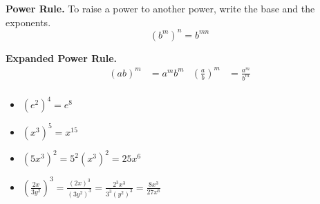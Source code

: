
\begin{tcbraster}[
    raster columns = 2,
    raster equal height,
    colback = white,
    raster before skip = 0in, raster after skip = 0in,
]
\begin{tcolorbox}[]
    {\bfseries Power Rule.}
    To raise a power to another power,
    write the base and  the exponents.
    \[\left(b^m\right)^n = b^{mn}\]
\end{tcolorbox}
\begin{tcolorbox}[]
    {\bfseries Expanded Power Rule.}
    \begin{align*}
        \left(ab\right)^m  &= a^m b^m     &\left(\frac{a}{b}\right)^m &= \frac{a^m}{b^m} \\
     \end{align*}
 \end{tcolorbox}


 \begin{tcolorbox}[enhanced,opacityframe=0,]
    \begin{itemize}
        \item $\left(e^2\right)^4 = e^8$
        \item $\left(x^3\right)^5 = x^{15}$
    \end{itemize}
    \end{tcolorbox}
    \begin{tcolorbox}[enhanced,opacityframe=0,]
        \begin{itemize}
            \item $(5x^3)^2 = 5^2 (x^3)^2 = 25 x^6$
            \item $
                \left(\frac{2x}{3y^2}\right)^3
                =
                \frac{(2x)^3}{(3y^2)^3}
                =
                \frac{2^3 x^3}{3^3 (y^2)^3}
                =
                \frac{8x^3}{27x^6}
                $
        \end{itemize}
    \end{tcolorbox}



\end{tcbraster}
